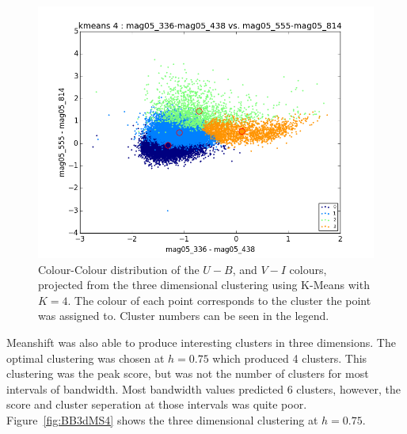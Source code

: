 \begin{figure}[H]
\centering
\includegraphics[width=\linewidth]{figs/kmeans_base_color_4cl_mag05_336-mag05_438vsmag05_555-mag05_814}
\caption{Colour-Colour distribution of the $U - B$, and $V - I$ colours, projected from the three dimensional clustering using K-Means with $K=4$. The colour of each point corresponds to the cluster the point was assigned to. Cluster numbers can be seen in the legend.}
\label{fig:BB3dKM4p}
\end{figure}

Meanshift was also able to produce interesting clusters in three dimensions. 
The optimal clustering was chosen at $h=0.75$ which produced 4 clusters.
This clustering was the peak score, but was not the number of clusters for most intervals of bandwidth.
Most bandwidth values predicted 6 clusters, however, the score and cluster seperation at those intervals was quite poor.
Figure~\ref{fig:BB3dMS4} shows the three dimensional clustering at $h=0.75$.

